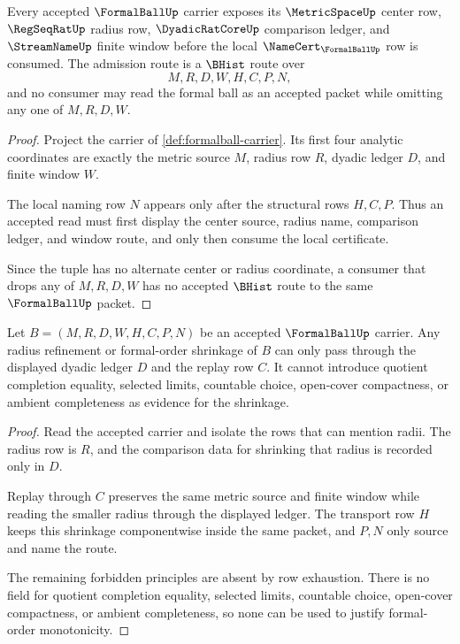 \begin{theorem}
\label{thm:formalball-center-radius-admission}
Every accepted $\FormalBallUp$ carrier exposes its $\MetricSpaceUp$ center row, $\RegSeqRatUp$ radius row, $\DyadicRatCoreUp$ comparison ledger, and $\StreamNameUp$ finite window before the local $\NameCert_{\FormalBallUp}$ row is consumed. The admission route is a $\BHist$ route over
$$
M,R,D,W,H,C,P,N,
$$
and no consumer may read the formal ball as an accepted packet while omitting any one of $M,R,D,W$.
\end{theorem}
\begin{proof}
Project the carrier of \autoref{def:formalball-carrier}. Its first four analytic coordinates are exactly the metric source $M$, radius row $R$, dyadic ledger $D$, and finite window $W$.

The local naming row $N$ appears only after the structural rows $H,C,P$. Thus an accepted read must first display the center source, radius name, comparison ledger, and window route, and only then consume the local certificate.

Since the tuple has no alternate center or radius coordinate, a consumer that drops any of $M,R,D,W$ has no accepted $\BHist$ route to the same $\FormalBallUp$ packet.
\end{proof}

\begin{theorem}
\label{thm:formalball-formal-order-monotonicity}
Let $B=(M,R,D,W,H,C,P,N)$ be an accepted $\FormalBallUp$ carrier. Any radius refinement or formal-order shrinkage of $B$ can only pass through the displayed dyadic ledger $D$ and the replay row $C$. It cannot introduce quotient completion equality, selected limits, countable choice, open-cover compactness, or ambient completeness as evidence for the shrinkage.
\end{theorem}
\begin{proof}
Read the accepted carrier and isolate the rows that can mention radii. The radius row is $R$, and the comparison data for shrinking that radius is recorded only in $D$.

Replay through $C$ preserves the same metric source and finite window while reading the smaller radius through the displayed ledger. The transport row $H$ keeps this shrinkage componentwise inside the same packet, and $P,N$ only source and name the route.

The remaining forbidden principles are absent by row exhaustion. There is no field for quotient completion equality, selected limits, countable choice, open-cover compactness, or ambient completeness, so none can be used to justify formal-order monotonicity.
\end{proof}

